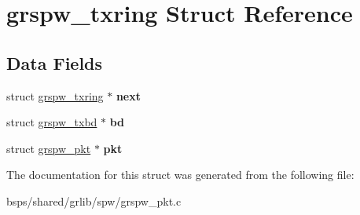 \hypertarget{structgrspw__txring}{}\section{grspw\+\_\+txring Struct Reference}
\label{structgrspw__txring}
\subsection*{Data Fields}
\begin{DoxyCompactItemize}
\item 
\mbox{\label{structgrspw__txring_a6cbec220804a8f0427e69441d8ccbf1d}} 
struct \mbox{\hyperlink{structgrspw__txring}{grspw\+\_\+txring}} $\ast$ {\bfseries next}
\item 
\mbox{\label{structgrspw__txring_a5fe3fd3df07608e915b49dc2ae80ad5a}} 
struct \mbox{\hyperlink{structgrspw__txbd}{grspw\+\_\+txbd}} $\ast$ {\bfseries bd}
\item 
\mbox{\label{structgrspw__txring_a48483cfca2e67d50842b3e40eaea4858}} 
struct \mbox{\hyperlink{structgrspw__pkt}{grspw\+\_\+pkt}} $\ast$ {\bfseries pkt}
\end{DoxyCompactItemize}


The documentation for this struct was generated from the following file\+:\begin{DoxyCompactItemize}
\item 
bsps/shared/grlib/spw/grspw\+\_\+pkt.\+c\end{DoxyCompactItemize}
